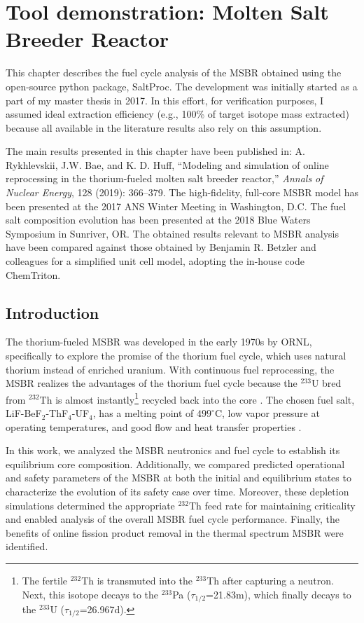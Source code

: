 \chapter{Tool demonstration: Molten Salt Breeder Reactor}

This chapter describes the fuel cycle analysis of the \gls{MSBR} obtained 
using the open-source python package, SaltProc. The development was initially 
started as a part of my master thesis \cite{rykhlevskii_advanced_2018} in 
2017.  In this effort, for verification purposes, I assumed ideal extraction 
efficiency (e.g., 100\% of target isotope mass extracted) because all 
available in the literature results also rely on this assumption.

The main results presented in this chapter have been published in: A. 
Rykhlevskii, J.W. Bae, and K. D. Huff, ``Modeling and simulation of online 
reprocessing in the thorium-fueled molten salt breeder reactor,'' 
\textit{Annals of Nuclear Energy}, 128 (2019): 366--379. The high-fidelity, 
full-core \gls{MSBR} model has been presented at the 2017 \gls{ANS} Winter 
Meeting in Washington, D.C. The fuel salt composition evolution has been 
presented at the 2018 Blue Waters Symposium in Sunriver, OR. The obtained 
results relevant to \gls{MSBR} analysis have been compared against those 
obtained by Benjamin R. Betzler and colleagues for a simplified unit cell 
model, adopting the in-house code ChemTriton. 


\section{Introduction}
The thorium-fueled \gls{MSBR} was developed in the early 1970s by \gls{ORNL},  
specifically to explore the promise of the thorium fuel cycle, which uses 
natural thorium instead of enriched uranium. With continuous fuel 
reprocessing, the \gls{MSBR} realizes the advantages of the thorium fuel cycle 
because the $^{233}$U bred from $^{232}$Th is almost instantly\footnote{\space 
The fertile $^{232}$Th is transmuted into the $^{233}$Th after capturing a 
neutron. Next, this isotope decays to the $^{233}$Pa ($\tau_{1/2}$=21.83m), 
which finally decays to the $^{233}$U ($\tau_{1/2}$=26.967d).} recycled back 
into the core  \cite{betzler_modeling_2016}. The chosen fuel salt, 
LiF-BeF$_2$-ThF$_4$-UF$_4$, has a melting point of $499^\circ$C, low vapor 
pressure at operating temperatures, and good flow and heat transfer properties 
\cite{robertson_conceptual_1971}. 

In this work, we analyzed the \gls{MSBR} neutronics and fuel cycle to  
establish its equilibrium core composition. Additionally, we compared  
predicted operational and safety parameters of the \gls{MSBR} at both the  
initial and equilibrium states to characterize the evolution of its safety 
case over time. Moreover, these depletion simulations determined the  
appropriate $^{232}$Th feed rate for maintaining criticality and enabled 
analysis of the overall \gls{MSBR} fuel cycle performance. Finally, the 
benefits of online fission product removal in the thermal spectrum \gls{MSBR} 
were identified.


